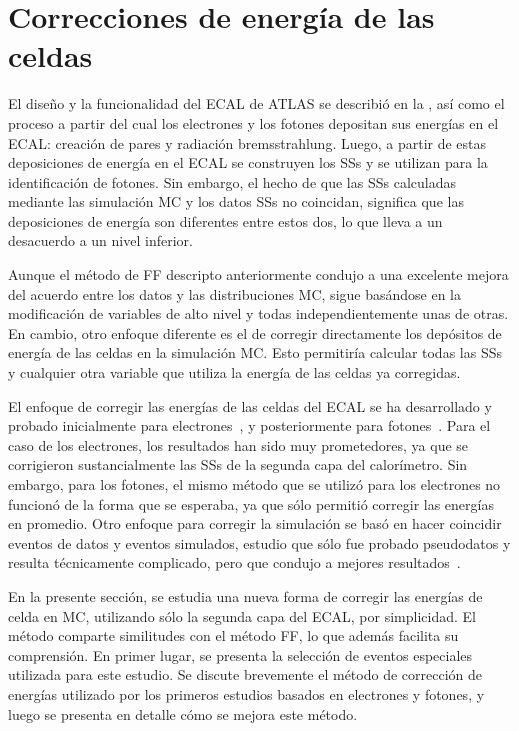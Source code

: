 \section{Correcciones de energ\'ia de las celdas}
\label{sec:ss_corrections:cell_rw}

El diseño y la funcionalidad del \ac{ECAL} de \ac{ATLAS} se describi\'o en la \Sect{\ref{subsubsec:atlas:atlas:cals:ecal}}, así como el proceso a partir del cual los electrones y los fotones depositan sus energías en el \ac{ECAL}: creación de pares y radiación bremsstrahlung. Luego, a partir de estas deposiciones de energía en el \ac{ECAL} se construyen los \acp{SS} y se utilizan para la identificación de fotones. Sin embargo, el hecho de que las \acp{SS} calculadas mediante las simulaci\'on \ac{MC} y los datos \acp{SS} no coincidan, significa que las deposiciones de energía son diferentes entre estos dos, lo que lleva a un desacuerdo a un nivel inferior.

Aunque el método de \acf{FF} descripto anteriormente condujo a una excelente mejora del acuerdo entre los datos y las distribuciones \ac{MC}, sigue basándose en la modificación de variables de alto nivel y todas independientemente unas de otras. En cambio, otro enfoque diferente es el de corregir directamente los depósitos de energía de las celdas en la simulación \ac{MC}.
Esto permitir\'ia calcular todas las \acfp{SS} y cualquier otra variable que utiliza la energ\'ia de las celdas ya corregidas.

El enfoque de corregir las energ\'ias de las celdas del \ac{ECAL} se ha desarrollado y probado inicialmente para electrones~\cite{thesis_khandoga}, y posteriormente para fotones~\cite{thesis_belfkir}. Para el caso de los electrones, los resultados han sido muy prometedores, ya que se corrigieron sustancialmente las \acp{SS} de la segunda capa del calor\'imetro. Sin embargo, para los fotones, el mismo método que se utilizó para los electrones no funcion\'o de la forma que se esperaba, ya que sólo permiti\'o corregir las energ\'ias en promedio. Otro enfoque para corregir la simulación se basó en hacer coincidir eventos de datos y eventos simulados, estudio que s\'olo fue probado pseudodatos y resulta técnicamente complicado, pero que condujo a mejores resultados~\cite{thesis_belfkir}.

En la presente sección, se estudia una nueva forma de corregir las energías de celda en \ac{MC}, utilizando sólo la segunda capa del \ac{ECAL}, por simplicidad. El método comparte similitudes con el método \ac{FF}, lo que adem\'as facilita su comprensión.
En primer lugar, se presenta la selección de eventos especiales utilizada para este estudio. Se discute brevemente el m\'etodo de correcci\'on de energ\'ias utilizado por los primeros estudios basados en electrones y fotones, y luego se presenta en detalle cómo se mejora este método.





